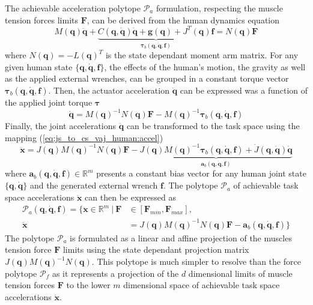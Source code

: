 The achievable acceleration polytope $\mathcal{P}_a$ formulation, respecting the muscle tension forces limits $\bm{F}$, can be derived from the human dynamics equation
\begin{equation}
M(\bm{q})\ddot{\bm{q}} + \underbrace{C(\bm{q},\dot{\bm{q}})\dot{\bm{q}} + \bm{g}(\bm{q}) + J^T(\bm{q})\bm{f}}_{\bm{\tau}_b(\bm{q},\dot{\bm{q}}, \bm{f})} = N(\bm{q}) \bm{F} 
\end{equation}
where $N(\bm{q})=-L(\bm{q})^T$ is the state dependant moment arm matrix. 
For any given human state $\{\bm{q},\dot{\bm{q}}, \bm{f}\}$, the effects of the human's motion, the gravity as well as the applied external wrenches, can be grouped in a constant torque vector $\bm{\tau}_b(\bm{q},\dot{\bm{q}},\bm{f})$. Then, the actuator acceleration $\ddot{\bm{q}}$ can be expressed was a function of the applied joint torque $\bm{\tau}$
\begin{equation}
    \ddot{\bm{q}} = M(\bm{q})^{-1}N(\bm{q})\bm{F} - M(\bm{q})^{-1}\bm{\tau}_b(\bm{q},\dot{\bm{q}}, \bm{f})
\end{equation}
Finally, the joint accelerations $\ddot{\bm{q}}$ can be transformed to the task space using the mapping (\ref{eq:js_to_cs_vaj_human:accel})
\begin{equation}
    \ddot{\bm{x}} = J(\bm{q})M(\bm{q})^{-1}N(\bm{q})\bm{F} - \underbrace{J(\bm{q})M(\bm{q})^{-1}\bm{\tau}_b(\bm{q},\dot{\bm{q}},\bm{f}) + \dot{J}(\bm{q}, \dot{\bm{q}})\dot{\bm{q}}}_{\bm{a}_b(\bm{q},\dot{\bm{q}},\bm{f})}
\end{equation}
where $\bm{a}_b(\bm{q},\dot{\bm{q}},\bm{f}) \in \mathbb{R}^m$ presents a constant bias vector for any human joint state $\{\bm{q},\dot{\bm{q}}\}$ and the generated external wrench $\bm{f}$. The polytope $\mathcal{P}_a$ of achievable task space accelerations $\ddot{\bm{x}}$ can then be expressed as
\begin{equation}
\begin{split}
    \mathcal{P}_a(\bm{q},\dot{\bm{q}},\bm{f}) = \{ \ddot{\bm{x}} \in \mathbb{R}^m ~|~ \bm{F}&\in\left[\bm{F}_{min}, \bm{F}_{max} \right],\\ \ddot{\bm{x}} &= J(\bm{q})M(\bm{q})^{-1}N(\bm{q})\bm{F} - \bm{a}_b(\bm{q},\dot{\bm{q}},\bm{f}) \}
\end{split}
\label{eq:poly_acceleration_hum}
\end{equation}
The polytope $\mathcal{P}_a$ is formulated as a linear and affine projection of the muscles tension force $\bm{F}$ limits using the state dependant projection matrix $J(\bm{q})M(\bm{q})^{-1}N(\bm{q})$.  This polytope is much simpler to resolve than the force polytope $\mathcal{P}_f$ as it represents a projection of the $d$ dimensional limits of muscle tension forces $\bm{F}$ to the lower $m$ dimensional space of achievable task space accelerations $\ddot{\bm{x}}$.

